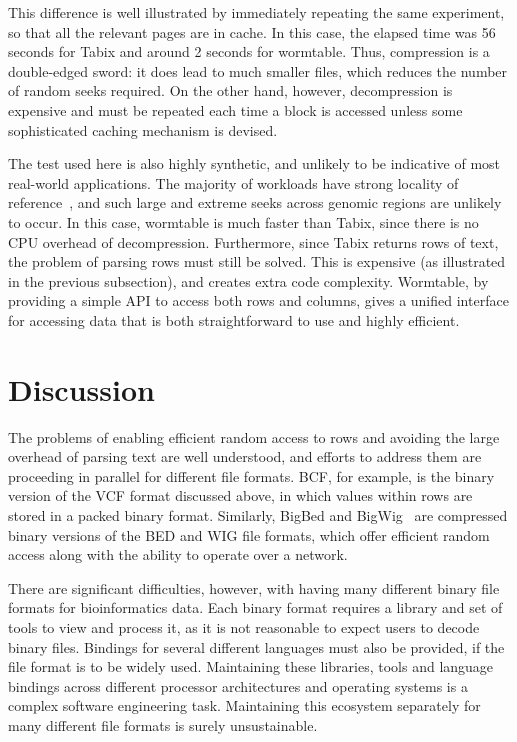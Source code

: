 \documentclass[10pt]{bmc_article}
\newenvironment{bmcformat}{\begin{raggedright}\baselineskip20pt\sloppy\setboolean{publ}{false}}{\end{raggedright}\baselineskip20pt\sloppy}
\begin{document}
\begin{bmcformat}
This difference is well illustrated by immediately repeating 
the same experiment, so that all the relevant pages are 
in cache. In this case, the elapsed time was 56 seconds for Tabix and around 
2 seconds for wormtable. Thus, compression is a double-edged sword: 
it does lead to much smaller files, which reduces the number of random seeks 
required.  On the other hand, however, decompression is expensive and must 
be repeated each time a block is accessed unless some sophisticated
caching mechanism is devised. 

The test used here is also highly synthetic, and unlikely to be 
indicative of most real-world applications. The majority of 
workloads have strong locality of reference~\cite{d05}, 
and such large and extreme seeks across genomic regions 
are unlikely to occur. In this case, wormtable 
is  much faster than Tabix, since there
is no CPU overhead of decompression. Furthermore, since 
Tabix returns rows of text, the problem of parsing rows
must still be solved. This is expensive (as illustrated 
in the previous subsection), and creates extra code 
complexity. Wormtable, by providing a simple API to 
access both rows and columns, gives a 
unified interface for accessing data that is 
both straightforward to use and highly efficient.


\section*{Discussion}
The problems of enabling efficient random access to rows and 
avoiding the large overhead of parsing text are well understood, 
and efforts to address them are proceeding in parallel for 
different file formats. 
BCF, for example, is the binary version of the VCF format discussed 
above, in which values within rows are stored in a packed binary 
format.  Similarly, BigBed and 
BigWig~\cite{kzbhk10} are compressed binary versions of the BED 
and WIG file formats, which offer efficient random access along 
with the ability to operate over a network. 

There are significant difficulties,
however, with having many different binary file formats for bioinformatics 
data. Each binary format requires a library and set of tools to view 
and process it, as it is not reasonable to expect users to decode binary
files. Bindings for several different languages must also be provided, if 
the file format is to be widely used.
Maintaining these libraries, tools and language bindings across 
different processor architectures and operating systems
is a complex software engineering task. Maintaining this ecosystem 
separately for many different file formats is surely 
unsustainable.


\end{bmcformat}
\end{document}
